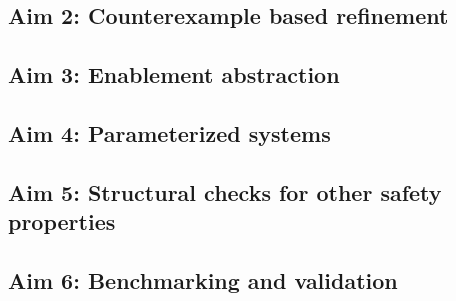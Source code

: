 \subsection{Aim 2: Counterexample based refinement} 

\subsection{Aim 3: Enablement abstraction } 


\subsection{Aim 4: Parameterized systems} 

\subsection{Aim 5: Structural checks for other safety properties} 
\subsection{Aim 6: Benchmarking and validation } 
